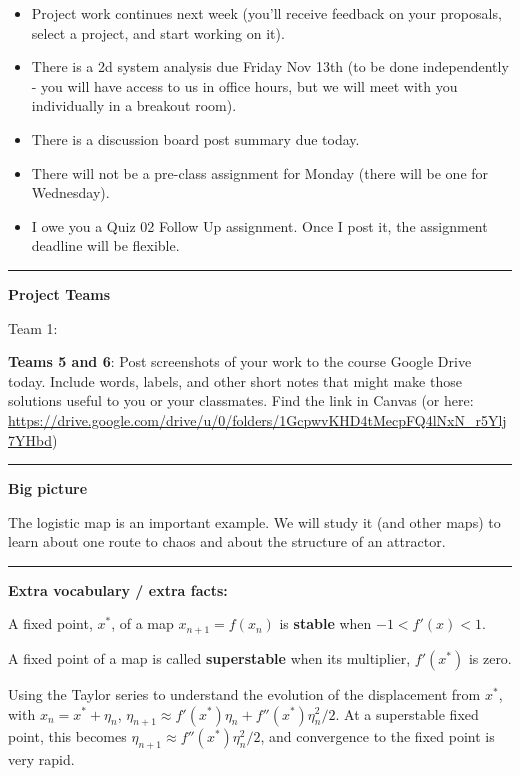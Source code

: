 \documentclass[12pt,letterpaper,noanswers]{exam}
\begin{document}
 \pdfpageheight 11in 
  \pdfpagewidth 8.5in

\noindent 




\begin{itemize}
\itemsep0em
\item Project work continues next week (you'll receive feedback on your proposals, select a project, and start working on it).
\item There is a 2d system analysis due Friday Nov 13th (to be done independently - you will have access to us in office hours, but we will meet with you individually in a breakout room).
\item There is a discussion board post summary due today.
\item There will not be a pre-class assignment for Monday (there will be one for Wednesday).
\item I owe you a Quiz 02 Follow Up assignment.  Once I post it, the assignment deadline will be flexible.
\end{itemize}

\hrule
\vspace{0.2cm}



\noindent\textbf{Project Teams}

Team 1: 


\noindent \textbf{Teams 5 and 6}: Post screenshots of your work to the course Google Drive today.  Include words, labels, and other short notes that might make those solutions useful to you or your classmates.  Find the link in Canvas (or here: \url{https://drive.google.com/drive/u/0/folders/1GcpwvKHD4tMecpFQ4lNxN_r5Ylj7YHbd})


\vspace{0.2cm}

\hrule
\vspace{0.2cm}


\noindent\textbf{Big picture}

The logistic map is an important example.  We will study it (and other maps) to learn about one route to chaos and about the structure of an attractor.
\vspace{0.2cm}
\hrule
\vspace{0.2cm}

\noindent \textbf{Extra vocabulary / extra facts:}
\begin{tcolorbox}
A fixed point, $x^*$, of a map $x_{n+1} = f(x_n)$ is \textbf{stable} when $-1<f'(x)<1$.  

A fixed point of a map is called \textbf{superstable} when its multiplier, $f'(x^*)$ is zero.  

Using the Taylor series to understand the evolution of the displacement from $x^*$, with $x_n = x^* + \eta_n$, $\eta_{n+1} \approx f'(x^*)\eta_n + f''(x^*)\eta_n^2/2$.  At a superstable fixed point, this becomes $\eta_{n+1} \approx f''(x^*)\eta_n^2/2$, and convergence to the fixed point is very rapid.
\end{tcolorbox}
\end{document}
